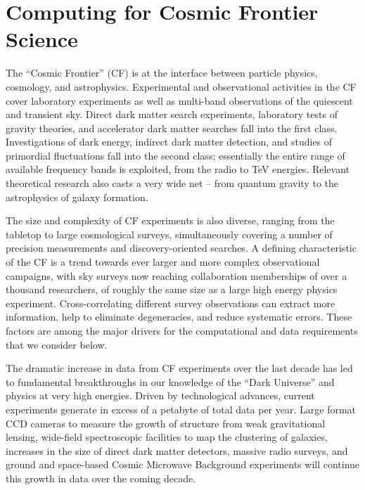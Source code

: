  
\section{Computing for Cosmic Frontier Science}


The ``Cosmic Frontier'' (CF) is at the interface
between particle physics, cosmology, and astrophysics. 
Experimental and observational activities in the CF cover
laboratory experiments as well as multi-band observations of the
quiescent and transient sky. 
Direct dark matter search experiments,
laboratory tests of gravity theories, and accelerator dark matter
searches fall into the first class. Investigations of dark energy,
indirect dark matter detection, and studies of primordial fluctuations
fall into the second class; essentially the entire range of available
frequency bands is exploited, from the radio to TeV energies. Relevant
theoretical research also casts a very wide net -- from quantum
gravity to the astrophysics of galaxy formation.

The size and complexity of CF experiments is also
diverse, ranging from the tabletop to large cosmological surveys,
simultaneously covering a number of precision measurements and
discovery-oriented searches. A defining characteristic of the CF 
is a trend towards ever larger and more complex observational
campaigns, with sky surveys now reaching collaboration memberships of
over a thousand researchers, of roughly the same size as a large high
energy physics experiment. Cross-correlating different survey
observations can extract more information, help to eliminate
degeneracies, and reduce systematic errors. These factors are among
the major drivers for the computational and data requirements that we
consider below.


The dramatic increase in data from CF experiments over
the last decade has led to fundamental breakthroughs in our knowledge
of the ``Dark Universe'' and physics at very high energies. Driven by
technological advances, current experiments generate in excess of a
petabyte of total data per year. Large format CCD cameras to measure
the growth of structure from weak gravitational lensing, wide-field
spectroscopic facilities to map the clustering of galaxies, increases
in the size of direct dark matter detectors, massive radio surveys,
and ground and space-based Cosmic Microwave Background 
experiments will continue this growth in data over the coming decade.

